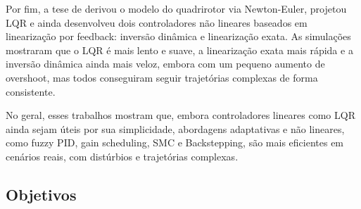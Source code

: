 Por fim, a tese de \cite{sabatino} derivou o modelo do quadrirotor via Newton-Euler, projetou LQR e ainda desenvolveu dois controladores não lineares baseados em linearização por feedback: inversão dinâmica e linearização exata. As simulações mostraram que o LQR é mais lento e suave, a linearização exata mais rápida e a inversão dinâmica ainda mais veloz, embora com um pequeno aumento de overshoot, mas todos conseguiram seguir trajetórias complexas de forma consistente.

No geral, esses trabalhos mostram que, embora controladores lineares como LQR ainda sejam úteis por sua simplicidade, abordagens adaptativas e não lineares, como fuzzy PID, gain scheduling, SMC e Backstepping, são mais eficientes em cenários reais, com distúrbios e trajetórias complexas.

\subsection{Objetivos}
\lipsum[1]
